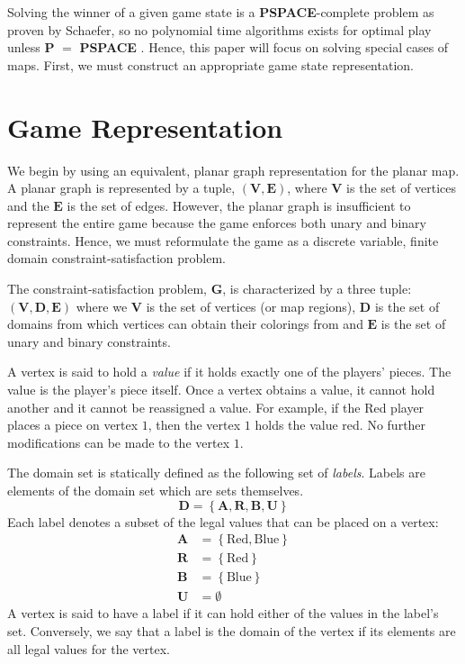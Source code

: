 \documentclass{sig-alternate}
\begin{document}
Solving the winner of a given game state is a \textbf{PSPACE}-complete problem
as proven by Schaefer, so no polynomial time algorithms exists for optimal play
unless \textbf{P} $=$ \textbf{PSPACE} \cite{Schaefer1978185}. Hence, this paper
will focus on solving special cases of maps. First, we must construct an
appropriate game state representation.

\section{Game Representation}

We begin by using an equivalent, planar graph representation for the planar
map. A planar graph is represented by a tuple, $(\mathbf{V}, \mathbf{E})$,
where $\mathbf{V}$ is the set of vertices and the $\mathbf{E}$ is the set of
edges.  However, the planar graph is insufficient to represent the entire game
because the game enforces both unary and binary constraints. Hence, we must
reformulate the game as a discrete variable, finite domain
constraint-satisfaction problem.

The constraint-satisfaction problem, $\mathbf{G}$, is characterized by a three
tuple: $(\mathbf{V}, \mathbf{D}, \mathbf{E})$ where we $\mathbf{V}$ is the set
of vertices (or map regions), $\mathbf{D}$ is the set of domains from which
vertices can obtain their colorings from and $\mathbf{E}$ is the set of unary
and binary constraints.

A vertex is said to hold a \emph{value} if it holds exactly one of the players'
pieces. The value is the player's piece itself. Once a vertex obtains a value,
it cannot hold another and it cannot be reassigned a value. For example, if the
Red player places a piece on vertex $1$, then the vertex $1$ holds the value
red. No further modifications can be made to the vertex $1$.

The domain set is statically defined as the following set of \emph{labels}. Labels
are elements of the domain set which are sets themselves.
\[
\mathbf{D} = \left\{\mathbf{A}, \mathbf{R}, \mathbf{B}, \mathbf{U}\right\}
\]
Each label denotes a subset of the legal values that can be placed on a
vertex:
\begin{align*}
	\mathbf{A} &= \left\{ \text{Red}, \text{Blue} \right\} \\
	\mathbf{R} &= \left\{ \text{Red} \right\} \\
	\mathbf{B} &= \left\{ \text{Blue} \right\} \\
	\mathbf{U} &= \emptyset
\end{align*}
A vertex is said to have a label if it can hold either of the values in the
label's set. Conversely, we say that a label is the domain of the vertex if
its elements are all legal values for the vertex.
\end{document}
